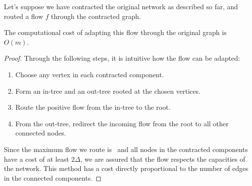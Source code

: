 \begin{lemma}
    \label{fixCont}
Let's suppose we have contracted the original network as described so far, and routed a flow $f$ through the contracted graph.

The computational cost of adapting this flow through the original graph is $O(m)$.
\end{lemma}
\begin{proof}

Through the following steps, it is intuitive how the flow can be adapted:

    \begin{enumerate}[nolistsep] 
        \item Choose any vertex in each contracted component. 
        \item Form an in-tree and an out-tree rooted at the chosen vertices. 
        \item Route the positive flow from the in-tree to the root. 
        \item From the out-tree, redirect the incoming flow from the root to all other connected nodes. 
    \end{enumerate}

Since the maximum flow we route is \dlt\ and all nodes in the contracted components have a cost of at least $2\Delta$, we are assured that the flow respects the capacities of the network.
This method has a cost directly proportional to the number of edges in the connected components.
\end{proof}


